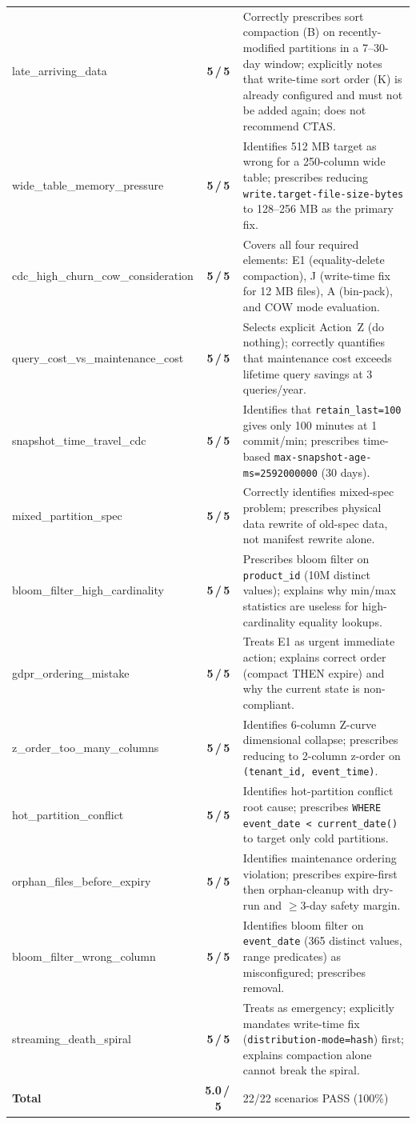 \documentclass[11pt,a4paper]{article}
\newcommand{\score}[1]{\textbf{#1\,/\,5}}
\newcommand{\code}[1]{\texttt{#1}}
\begin{document}
\begin{longtable}{lcp{7.5cm}}
late\_arriving\_data              & \score{5} & Correctly prescribes sort compaction (B) on recently-modified partitions in a 7--30-day window; explicitly notes that write-time sort order (K) is already configured and must not be added again; does not recommend CTAS. \\[3pt]
wide\_table\_memory\_pressure     & \score{5} & Identifies 512 MB target as wrong for a 250-column wide table; prescribes reducing \code{write.target-file-size-bytes} to 128--256 MB as the primary fix. \\[3pt]
cdc\_high\_churn\_cow\_consideration & \score{5} & Covers all four required elements: E1 (equality-delete compaction), J (write-time fix for 12 MB files), A (bin-pack), and COW mode evaluation. \\[3pt]
query\_cost\_vs\_maintenance\_cost & \score{5} & Selects explicit Action~Z (do nothing); correctly quantifies that maintenance cost exceeds lifetime query savings at 3 queries/year. \\[3pt]
snapshot\_time\_travel\_cdc       & \score{5} & Identifies that \code{retain\_last=100} gives only 100 minutes at 1 commit/min; prescribes time-based \code{max-snapshot-age-ms=2592000000} (30 days). \\[3pt]
mixed\_partition\_spec            & \score{5} & Correctly identifies mixed-spec problem; prescribes physical data rewrite of old-spec data, not manifest rewrite alone. \\[3pt]
bloom\_filter\_high\_cardinality  & \score{5} & Prescribes bloom filter on \code{product\_id} (10M distinct values); explains why min/max statistics are useless for high-cardinality equality lookups. \\[3pt]
gdpr\_ordering\_mistake           & \score{5} & Treats E1 as urgent immediate action; explains correct order (compact THEN expire) and why the current state is non-compliant. \\[3pt]
z\_order\_too\_many\_columns      & \score{5} & Identifies 6-column Z-curve dimensional collapse; prescribes reducing to 2-column z-order on \code{(tenant\_id, event\_time)}. \\[3pt]
hot\_partition\_conflict          & \score{5} & Identifies hot-partition conflict root cause; prescribes \code{WHERE event\_date < current\_date()} to target only cold partitions. \\[3pt]
orphan\_files\_before\_expiry     & \score{5} & Identifies maintenance ordering violation; prescribes expire-first then orphan-cleanup with dry-run and $\geq$3-day safety margin. \\[3pt]
bloom\_filter\_wrong\_column      & \score{5} & Identifies bloom filter on \code{event\_date} (365 distinct values, range predicates) as misconfigured; prescribes removal. \\[3pt]
streaming\_death\_spiral          & \score{5} & Treats as emergency; explicitly mandates write-time fix (\code{distribution-mode=hash}) first; explains compaction alone cannot break the spiral. \\[3pt]
\midrule
\textbf{Total} & \textbf{5.0\,/\,5} & 22/22 scenarios PASS (100\%) \\
\end{longtable}
\end{document}
